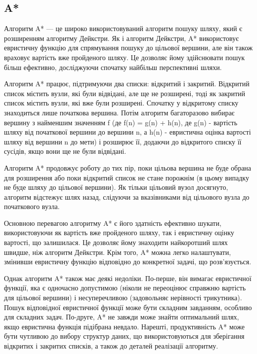 \subsection{A*}
\label{subsec:a-star-subsection}

Алгоритм A* --- це широко використовуваний алгоритм пошуку шляху, який є розширенням алгоритму Дейкстри. Як і алгоритм Дейкстри, A* використовує евристичну функцію для спрямування пошуку до цільової вершини, але він також враховує вартість вже пройденого шляху. Це дозволяє йому здійснювати пошук більш ефективно, досліджуючи спочатку найбільш перспективні шляхи.

Алгоритм A* працює, підтримуючи два списки: відкритий і закритий. Відкритий список містить вузли, які були відвідані, але ще не розширені, тоді як закритий список містить вузли, які вже були розширені. Спочатку у відкритому списку знаходиться лише початкова вершина. Потім алгоритм багаторазово вибирає вершину з найменшим значенням f (де f(n) = g(n) + h(n), де g(n) - вартість шляху від початкової вершини до вершини n, а h(n) - евристична оцінка вартості шляху від вершини n до мети) і розширює її, додаючи до відкритого списку її сусідів, якщо вони ще не були відвідані.

Алгоритм A* продовжує роботу до тих пір, поки цільова вершина не буде обрана для розширення або поки відкритий список не стане порожнім (в цьому випадку не буде шляху до цільової вершини). Як тільки цільовий вузол досягнуто, алгоритм відстежує шлях назад, слідуючи за вказівниками від цільового вузла до початкового вузла.

Основною перевагою алгоритму A* є його здатність ефективно шукати, використовуючи як вартість вже пройденого шляху, так і евристичну оцінку вартості, що залишилася. Це дозволяє йому знаходити найкоротший шлях швидше, ніж алгоритм Дейкстри. Крім того, A* можна легко налаштувати, змінивши евристичну функцію відповідно до конкретної задачі, що розв'язується.

Однак алгоритм A* також має деякі недоліки. По-перше, він вимагає евристичної функції, яка є одночасно допустимою (ніколи не переоцінює справжню вартість для цільової вершини) і несуперечливою (задовольняє нерівності трикутника). Пошук відповідної евристичної функції може бути складним завданням, особливо для складних задач. По-друге, A* не завжди може знайти оптимальний шлях, якщо евристична функція підібрана невдало. Нарешті, продуктивність A* може бути чутливою до вибору структур даних, що використовуються для зберігання відкритих і закритих списків, а також до деталей реалізації алгоритму.\\

